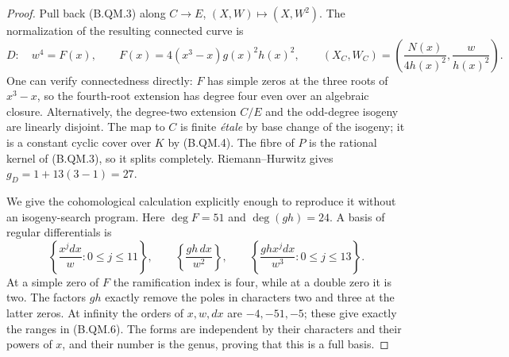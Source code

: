 \documentclass[11pt,a4paper]{article}
\begin{document}
\begin{proof}
Pull back (B.QM.3) along $C\to E$, $(X,W)\mapsto(X,W^2)$.
The normalization of the resulting connected curve is
\[
 D:\quad w^4=F(x),\qquad
 F(x)=4(x^3-x)g(x)^2h(x)^2,\qquad
 (X_C,W_C)=\left(\frac{N(x)}{4h(x)^2},\frac{w}{h(x)^2}\right).
                                                                  \tag{B.QM.5}
\]
One can verify connectedness directly: $F$ has simple zeros
at the three roots of $x^3-x$, so the fourth-root extension
has degree four even over an algebraic closure. Alternatively,
the degree-two extension $C/E$ and the odd-degree isogeny are
linearly disjoint. The map to $C$ is finite \emph{\'etale} by
base change of the isogeny; it is a constant cyclic cover over
$K$ by (B.QM.4). The fibre of $P$ is the rational kernel of
(B.QM.3), so it splits completely. Riemann--Hurwitz gives
$g_D=1+13(3-1)=27$.

We give the cohomological calculation explicitly enough to
reproduce it without an isogeny-search program. Here $\deg F=51$
and $\deg(gh)=24$. A basis of regular differentials is
\[
 \left\{\frac{x^jdx}{w}:0\le j\le11\right\},\qquad
 \left\{\frac{gh\,dx}{w^2}\right\},\qquad
 \left\{\frac{ghx^jdx}{w^3}:0\le j\le13\right\}.                \tag{B.QM.6}
\]
At a simple zero of $F$ the ramification index is four, while
at a double zero it is two. The factors $gh$ exactly remove
the poles in characters two and three at the latter zeros.
At infinity the orders of $x,w,dx$ are $-4,-51,-5$;
these give exactly the ranges in (B.QM.6). The forms are
independent by their characters and their powers of $x$, and
their number is the genus, proving that this is a full basis.


\end{proof}
\end{document}
